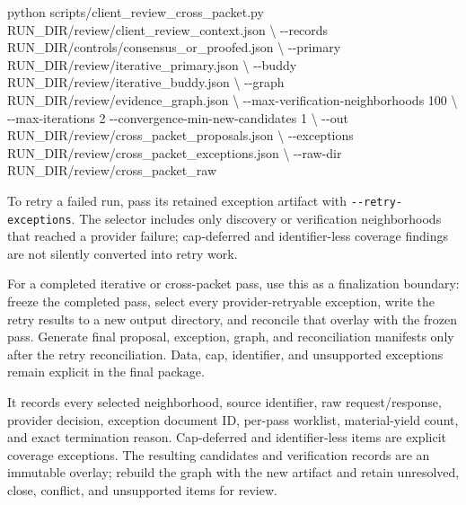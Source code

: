 \documentclass[
]{article}
\newenvironment{Shaded}{}{}
\newcommand{\AttributeTok}[1]{\textcolor[rgb]{0.49,0.56,0.16}{#1}}
\newcommand{\DataTypeTok}[1]{\textcolor[rgb]{0.56,0.13,0.00}{#1}}
\newcommand{\ExtensionTok}[1]{#1}
\newcommand{\NormalTok}[1]{#1}
\begin{document}
\begin{Shaded}
\begin{Highlighting}[]
\ExtensionTok{python}\NormalTok{ scripts/client\_review\_cross\_packet.py RUN\_DIR/review/client\_review\_context.json }\DataTypeTok{\textbackslash{}}
  \AttributeTok{{-}{-}records}\NormalTok{ RUN\_DIR/controls/consensus\_or\_proofed.json }\DataTypeTok{\textbackslash{}}
  \AttributeTok{{-}{-}primary}\NormalTok{ RUN\_DIR/review/iterative\_primary.json }\DataTypeTok{\textbackslash{}}
  \AttributeTok{{-}{-}buddy}\NormalTok{ RUN\_DIR/review/iterative\_buddy.json }\DataTypeTok{\textbackslash{}}
  \AttributeTok{{-}{-}graph}\NormalTok{ RUN\_DIR/review/evidence\_graph.json }\DataTypeTok{\textbackslash{}}
  \AttributeTok{{-}{-}max{-}verification{-}neighborhoods}\NormalTok{ 100 }\DataTypeTok{\textbackslash{}}
  \AttributeTok{{-}{-}max{-}iterations}\NormalTok{ 2 }\AttributeTok{{-}{-}convergence{-}min{-}new{-}candidates}\NormalTok{ 1 }\DataTypeTok{\textbackslash{}}
  \AttributeTok{{-}{-}out}\NormalTok{ RUN\_DIR/review/cross\_packet\_proposals.json }\DataTypeTok{\textbackslash{}}
  \AttributeTok{{-}{-}exceptions}\NormalTok{ RUN\_DIR/review/cross\_packet\_exceptions.json }\DataTypeTok{\textbackslash{}}
  \AttributeTok{{-}{-}raw{-}dir}\NormalTok{ RUN\_DIR/review/cross\_packet\_raw}
\end{Highlighting}
\end{Shaded}

To retry a failed run, pass its retained exception artifact with
\texttt{-\/-retry-exceptions}. The selector includes only discovery or
verification neighborhoods that reached a provider failure; cap-deferred
and identifier-less coverage findings are not silently converted into
retry work.

For a completed iterative or cross-packet pass, use this as a
finalization boundary: freeze the completed pass, select every
provider-retryable exception, write the retry results to a new output
directory, and reconcile that overlay with the frozen pass. Generate
final proposal, exception, graph, and reconciliation manifests only
after the retry reconciliation. Data, cap, identifier, and unsupported
exceptions remain explicit in the final package.

It records every selected neighborhood, source identifier, raw
request/response, provider decision, exception document ID, per-pass
worklist, material-yield count, and exact termination reason.
Cap-deferred and identifier-less items are explicit coverage exceptions.
The resulting candidates and verification records are an immutable
overlay; rebuild the graph with the new artifact and retain unresolved,
close, conflict, and unsupported items for review.
\end{document}
